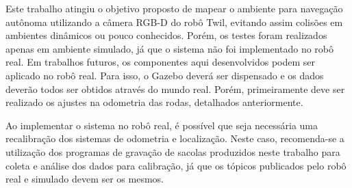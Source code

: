 \documentclass[repeatfields,xlists,xpacks,oneside,yearsonly]{ufrgscca}
\begin{document}
Este trabalho atingiu o objetivo proposto de mapear o ambiente para
navegação autônoma utilizando a câmera RGB-D do robô Twil, evitando
assim colisões em ambientes dinâmicos ou pouco conhecidos. Porém, os
testes foram realizados apenas em ambiente simulado, já que o sistema
não foi implementado no robô real. Em trabalhos futuros, os
componentes aqui desenvolvidos podem ser aplicado no robô real. Para
isso, o Gazebo deverá ser dispensado e os dados deverão todos ser
obtidos através do mundo real. Porém, primeiramente deve ser
realizado os ajustes na odometria das rodas, detalhados
anteriormente.

Ao implementar o sistema no robô real, é possível que seja necessária
uma recalibração dos sistemas de odometria e localização. Neste caso,
recomenda-se a utilização dos programas de gravação de sacolas
produzidos neste trabalho para coleta e análise dos dados para
calibração, já que os tópicos publicados pelo robô real e simulado
devem ser os mesmos.

\printbibliography

%
%
%
\end{document}
